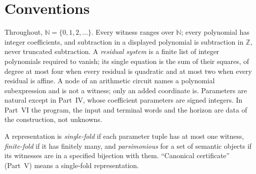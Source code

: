 \documentclass[11pt,a4paper]{article}
\theoremstyle{definition}
\theoremstyle{remark}
\newcommand{\N}{\mathbb N}
\newcommand{\Z}{\mathbb Z}
\begin{document}
\section{Conventions}\label{cdc:conv:sec}
Throughout, $\N=\{0,1,2,\ldots\}$. Every witness ranges over $\N$; every
polynomial has integer coefficients, and subtraction in a displayed
polynomial is subtraction in $\Z$, never truncated subtraction. A
\emph{residual system} is a finite list of integer polynomials required to
vanish; its single equation is the sum of their squares, of degree at most
four when every residual is quadratic and at most two when every residual
is affine. A node of an arithmetic circuit names a polynomial subexpression
and is not a witness; only an added coordinate is. Parameters are natural
except in Part~IV, whose coefficient parameters are signed integers. In
Part~VI the program, the input and terminal words and the horizon are data
of the construction, not unknowns.

A representation is \emph{single-fold} if each parameter tuple has at most
one witness, \emph{finite-fold} if it has finitely many, and
\emph{parsimonious} for a set of semantic objects if its witnesses are in a
specified bijection with them. ``Canonical certificate'' (Part~V) means a
single-fold representation.
\end{document}
